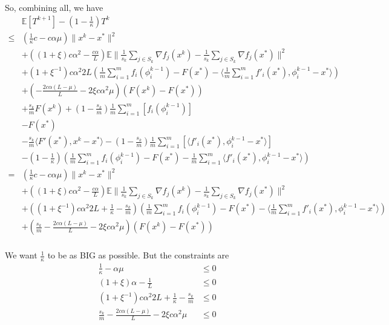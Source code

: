 \documentclass[11pt]{article}
\begin{document}
		
		So, combining all, we have 
				\begin{align*}
					&\mathbb{E}\left[ T^{k+1} \right] - \left(1-\frac{1}{\kappa} \right) T^k \\
					\leq  &( \frac{1}{\kappa}c-c \alpha \mu)\|x^k - x^* \|^2 \\
			&+ ((1+\xi)c \alpha^2 - \frac{c \alpha }{L})\mathbb{E} \| \frac{1}{s_k} \sum_{j \in S_k}   \nabla f_j(x^k) -\frac{1}{s_k} \sum_{j \in S_k}   \nabla f_j(x^*) \|^2\\
			&+(1+\xi^{-1})c \alpha^2 2L(\frac{1}{m}\sum_{i =1}^{m}  f_i(\phi_i^{k-1})   - F(x^*)  -  \langle \frac{1 }{m} \sum_{i =1}^{m}   f'_i(x^*), \phi_i^{k-1} - x^*\rangle)\\
		&+( -\frac{2c \alpha(L - \mu)}{L}- 2 \xi c \alpha^2 \mu) (F(x^k) - F(x^*))\\
		&+\frac{s_k}{m}  F(x^k) + \left(1 - \frac{s_k}{m} \right )\frac{1}{m} \sum_{i =1}^{m} \left[  f_i(\phi_i^{k-1}) \right] \\		
		&-F(x^*)\\
		& -\frac{s_k}{m}  \langle F'(x^*), x^k - x^*\rangle  -\left(1 - \frac{s_k}{m} \right ) \frac{1}{m}  \sum_{i =1}^{m} \left[   \langle f'_i(x^*), \phi_i^{k-1} - x^*\rangle \right] \\
		&-  \left(1-\frac{1}{\kappa} \right)( \frac{1}{m} \sum_{i =1}^{m} f_i(\phi_i^{k-1}) - F(x^*) - \frac{1}{m}  \sum_{i =1}^{m} \langle f'_i(x^*), \phi_i^{k-1} - x^*\rangle )	\\
		= &( \frac{1}{\kappa}c-c \alpha \mu)\|x^k - x^* \|^2 \\
			&+ ((1+\xi)c \alpha^2 - \frac{c \alpha }{L})\mathbb{E} \| \frac{1}{s_k} \sum_{j \in S_k}   \nabla f_j(x^k) -\frac{1}{s_k} \sum_{j \in S_k}   \nabla f_j(x^*) \|^2\\
			&+((1+\xi^{-1})c \alpha^2 2L+\frac{1}{\kappa}- \frac{s_k}{m})(\frac{1}{m}\sum_{i =1}^{m}  f_i(\phi_i^{k-1})   - F(x^*)  -  \langle \frac{1 }{m} \sum_{i =1}^{m}   f'_i(x^*), \phi_i^{k-1} - x^*\rangle)\\
		&+(\frac{s_k}{m} -\frac{2c \alpha(L - \mu)}{L}- 2 \xi c \alpha^2 \mu) (F(x^k) - F(x^*))\\
	\end{align*}
		
		We want $\frac{1}{\kappa}$ to be as BIG as possible. But the constraints are 
		\begin{align*}
			 \frac{1}{\kappa}- \alpha \mu &\leq 0 \\
			(1+\xi)\alpha - \frac{1 }{L}  &\leq 0 \\
			(1+\xi^{-1})c \alpha^2 2L+\frac{1}{\kappa}- \frac{s_k}{m}&\leq 0 \\
		    \frac{s_k}{m} -\frac{2c \alpha(L - \mu)}{L}- 2 \xi c \alpha^2 \mu &\leq 0 \\
		\end{align*}
		
\end{document}
